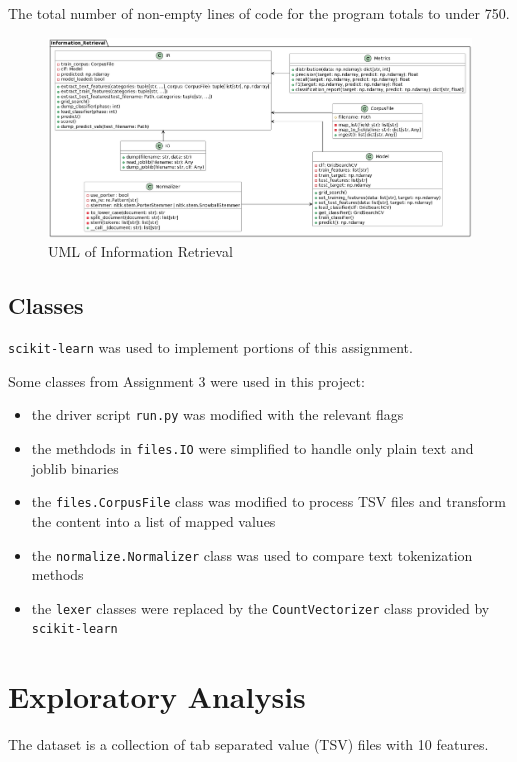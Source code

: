 \documentclass[11pt]{article}
\begin{document}
The total number of non-empty lines of code for the program totals to under 750.

\begin{figure}[!ht]
    \includegraphics[scale=0.35]{statics/uml.png}
    \centering
    \caption{UML of Information Retrieval}
\end{figure}

\subsection*{Classes}
\texttt{scikit-learn} was used to implement portions of this assignment.

Some classes from Assignment 3 were used in this project:
\begin{itemize}
    \item the driver script \texttt{run.py} was modified with the relevant flags
    \item the methdods in \texttt{files.IO} were simplified to handle only plain text and joblib binaries
    \item the \texttt{files.CorpusFile} class was modified to process TSV files and transform the content into a list of mapped values
    \item the \texttt{normalize.Normalizer} class was used to compare text tokenization methods
    \item the \texttt{lexer} classes were replaced by the \texttt{CountVectorizer} class provided by \texttt{scikit-learn}
\end{itemize}

\section*{Exploratory Analysis}
The dataset is a collection of tab separated value (TSV) files with 10 features.
\end{document}
